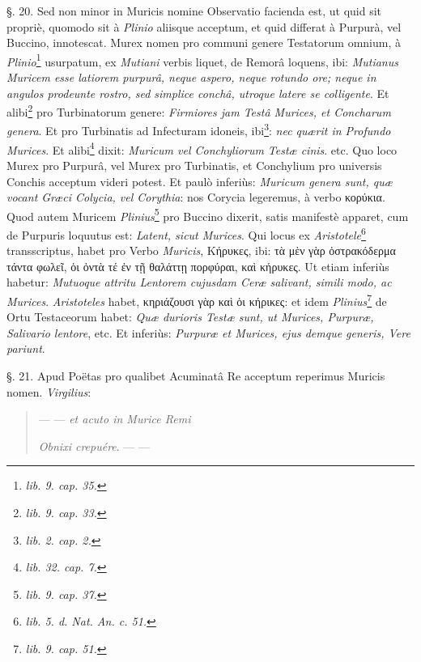 \documentclass[a4paper, 11pt, oneside, polutonikogreek, german]{article}
\begin{document}
§. 20. Sed non minor in Muricis nomine Observatio facienda est, ut quid sit propriè, quomodo sit à \emph{Plinio} aliisque acceptum, et quid differat à Purpurà, vel Buccino, innotescat. Murex nomen pro communi genere Testatorum omnium, à \emph{Plinio}\footnote{\emph{lib. 9. cap. 35.}} usurpatum, ex \emph{Mutiani} verbis liquet, de Remorâ loquens, ibi: \emph{Mutianus Muricem esse latiorem purpurâ, neque aspero, neque rotundo ore; neque in angulos prodeunte rostro, sed simplice conchâ, utroque latere se colligente}. Et alibi\footnote{\emph{lib. 9. cap. 33.}} pro Turbinatorum genere: \emph{Firmiores jam Testâ Murices, et Concharum genera}. Et pro Turbinatis ad Infecturam idoneis, ibi\footnote{\emph{lib. 2. cap. 2.}}: \emph{nec quærit in Profundo Murices}. Et alibi\footnote{\emph{lib. 32. cap. 7.}} dixit: \emph{Muricum vel Conchyliorum Testæ cinis}. etc. Quo loco Murex pro Purpurâ, vel Murex pro Turbinatis, et Conchylium pro universis Conchis acceptum videri potest. Et paulò inferiùs: \emph{Muricum genera sunt, quæ vocant Græci Colycia, vel Corythia}: nos Corycia legeremus, à verbo κορύκια. Quod autem Muricem \emph{Plinius}\footnote{\emph{lib. 9. cap. 37.}} pro Buccino dixerit, satis manifestè apparet, cum de Purpuris loquutus est: \emph{Latent, sicut Murices}. Qui locus ex \emph{Aristotele}\footnote{\emph{lib. 5. d. Nat. An. c. 51.}} transscriptus, habet pro Verbo \emph{Muricis}, Κήρυκες, ibi: τὰ μὲν γὰρ ὀστρακόδερμα τάντα φωλεῖ, ὁι ὀντὰ τέ ἐν τῇ θαλάττῃ πορφύραι, καὶ κήρυκες. Ut etiam inferiùs habetur: \emph{Mutuoque attritu Lentorem cujusdam Ceræ salivant, simili modo, ac Murices}. \emph{Aristoteles} habet, κηριάζουσι γὰρ καὶ ὁι κήρικες: et idem \emph{Plinius}\footnote{\emph{lib. 9. cap. 51.}} de Ortu Testaceorum habet: \emph{Quæ durioris Testæ sunt, ut Murices, Purpuræ, Salivario lentore}, etc. Et inferiùs: \emph{Purpuræ et Murices, ejus demque generis, Vere pariunt}.

§. 21. Apud Poëtas pro qualibet Acuminatâ Re acceptum reperimus Muricis nomen. \emph{Virgilius}:
\begin{quotation}
--- --- \emph{et acuto in Murice Remi}

\emph{Obnixi crepuére}. --- ---
\end{quotation}
\end{document}
